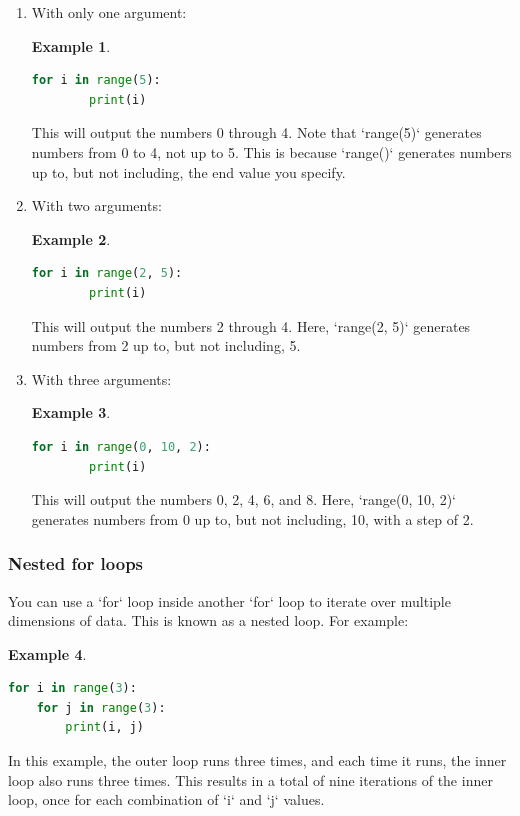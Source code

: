 \documentclass[12pt]{article}
\newtheorem{Example}{Example}[section]
\begin{document}
\begin{enumerate}
    \item With only one argument: \\
    \begin{Example}
    \begin{lstlisting}[language=Python]
    for i in range(5):
        print(i)
    \end{lstlisting}
    \end{Example}
    This will output the numbers 0 through 4. Note that `range(5)` generates numbers from 0 to 4, not up to 5. This is because `range()` generates numbers up to, but not including, the end value you specify.

    \item With two arguments: \\
    \begin{Example}
    \begin{lstlisting}[language=Python]
    for i in range(2, 5):
        print(i)
    \end{lstlisting}
    \end{Example}
    This will output the numbers 2 through 4. Here, `range(2, 5)` generates numbers from 2 up to, but not including, 5.

    \item With three arguments: \\
    \begin{Example}
    \begin{lstlisting}[language=Python]
    for i in range(0, 10, 2):
        print(i)
    \end{lstlisting}
    \end{Example}
    This will output the numbers 0, 2, 4, 6, and 8. Here, `range(0, 10, 2)` generates numbers from 0 up to, but not including, 10, with a step of 2.
\end{enumerate}

\subsubsection{Nested for loops}
You can use a `for` loop inside another `for` loop to iterate over multiple dimensions of data. This is known as a nested loop. For example:
\begin{Example}
\begin{lstlisting}[language=Python]
for i in range(3):
    for j in range(3):
        print(i, j)
\end{lstlisting}
\end{Example}
In this example, the outer loop runs three times, and each time it runs, the inner loop also runs three times. This results in a total of nine iterations of the inner loop, once for each combination of `i` and `j` values.
\end{document}
